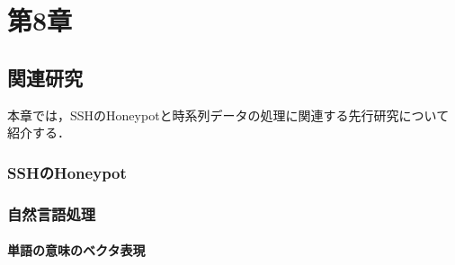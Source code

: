 \chapter{第8章}
 \label{rela}

\section{関連研究}
本章では，SSHのHoneypotと時系列データの処理に関連する先行研究について紹介する．
\subsection{SSHのHoneypot}
\subsection{自然言語処理}
\subsubsection{単語の意味のベクタ表現}

